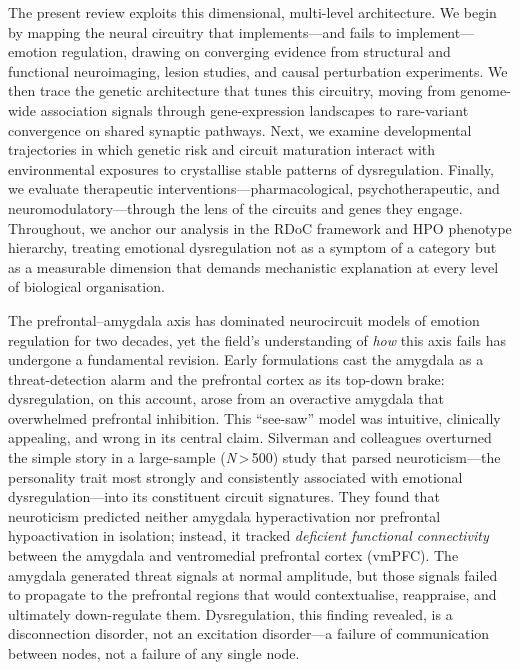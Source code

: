 The present review exploits this dimensional, multi-level architecture.  We
begin by mapping the neural circuitry that implements---and fails to
implement---emotion regulation, drawing on converging evidence from
structural and functional neuroimaging, lesion studies, and causal
perturbation experiments.  We then trace the genetic architecture that
tunes this circuitry, moving from genome-wide association signals through
gene-expression landscapes to rare-variant convergence on shared synaptic
pathways.  Next, we examine developmental trajectories in which genetic risk
and circuit maturation interact with environmental exposures to crystallise
stable patterns of dysregulation.  Finally, we evaluate therapeutic
interventions---pharmacological, psychotherapeutic, and
neuromodulatory---through the lens of the circuits and genes they engage.
Throughout, we anchor our analysis in the RDoC framework and HPO phenotype
hierarchy, treating emotional dysregulation not as a symptom of a category
but as a measurable dimension that demands mechanistic explanation at every
level of biological organisation.



The prefrontal--amygdala axis has dominated neurocircuit models of emotion
regulation for two decades, yet the field's understanding of \emph{how}
this axis fails has undergone a fundamental revision.  Early formulations
cast the amygdala as a threat-detection alarm and the prefrontal cortex as
its top-down brake: dysregulation, on this account, arose from an
overactive amygdala that overwhelmed prefrontal inhibition.  This ``see-saw''
model was intuitive, clinically appealing, and wrong in its central claim.
Silverman and colleagues overturned the simple story in a large-sample
(\emph{N}\,>\,500) study that parsed neuroticism---the personality trait
most strongly and consistently associated with emotional
dysregulation---into its constituent circuit signatures.  They found
that neuroticism predicted neither amygdala hyperactivation nor prefrontal
hypoactivation in isolation; instead, it tracked \emph{deficient functional
connectivity} between the amygdala and ventromedial prefrontal cortex
(vmPFC).  The amygdala generated threat signals at normal amplitude, but
those signals failed to propagate to the prefrontal regions that would
contextualise, reappraise, and ultimately down-regulate them.
Dysregulation, this finding revealed, is a disconnection disorder, not an
excitation disorder---a failure of communication between nodes, not a
failure of any single node.

